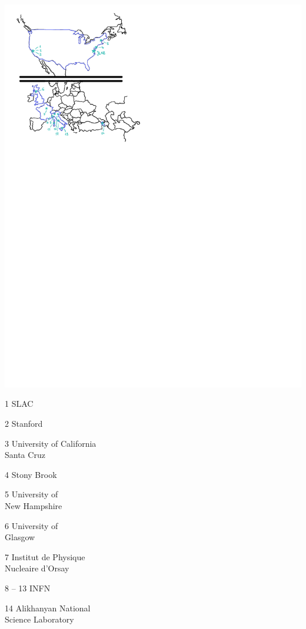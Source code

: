 \begin{poster}
{			\begin{minipage}{0.55\columnwidth}
				\centering
				\includegraphics[width=0.9\columnwidth]{figs/collabMap.pdf}
			\end{minipage}%
			\begin{minipage}{0.45\columnwidth}
				\begin{compactitem}
					\item[1] SLAC
					\item[2] Stanford
					\item[3] University of California\\ Santa Cruz
					\item[4] Stony Brook
					\item[5] University of\\ New Hampshire
					\item[6] University of\\ Glasgow
					\item[7] Institut de Physique\\ Nucleaire d’Orsay
					\item[8]-- 13 INFN
					\item[14] Alikhanyan National\\ Science Laboratory
					\item[]
				\end{compactitem}
			\end{minipage}
		}



\end{poster}
